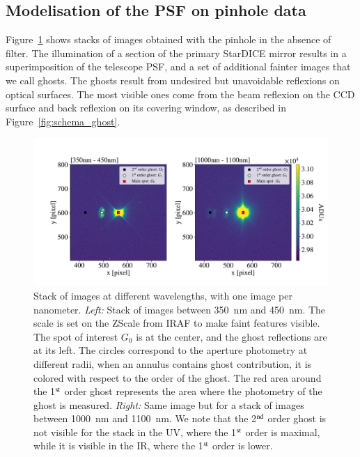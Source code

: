 \subsection{Modelisation of the \SD PSF on \spinhole pinhole data}

Figure~\ref{fig:ghost_contrast} shows stacks of images obtained with the \spinhole pinhole in the absence of filter. The illumination of a section of the primary StarDICE mirror results in a superimposition of the \SD telescope PSF, and a set of additional fainter images that we call ghosts. The ghosts result from undesired but unavoidable reflexions on optical surfaces. The most visible ones come from the beam reflexion on the CCD surface and back reflexion on its covering window, as described in Figure~\ref{fig:schema_ghost}.\\

\begin{figure}[h]
    \centering
    \includegraphics[width=\columnwidth]{fig/ghost_contrast.pdf}
    \caption{Stack of images at different wavelengths, with one image per nanometer. \textit{Left:} Stack of images between \SI{350}{\nano\meter} and \SI{450}{\nano\meter}. The scale is set on the ZScale from IRAF to make faint features visible. The spot of interest $G_0$ is at the center, and the ghost reflections are at its left. The circles correspond to the aperture photometry at different radii, when an annulus contains ghost contribution, it is colored with respect to the order of the ghost. The red area around the 1$\textsuperscript{st}$ order ghost represents the area where the photometry of the ghost is measured. \textit{Right:} Same image but for a stack of images between \SI{1000}{\nano\meter} and \SI{1100}{\nano\meter}. We note that the 2$\textsuperscript{nd}$ order ghost is not visible for the stack in the UV, where the 1$\textsuperscript{st}$ order is maximal, while it is visible in the IR, where the 1$\textsuperscript{st}$ order is lower.}
    \label{fig:ghost_contrast}
\end{figure}

